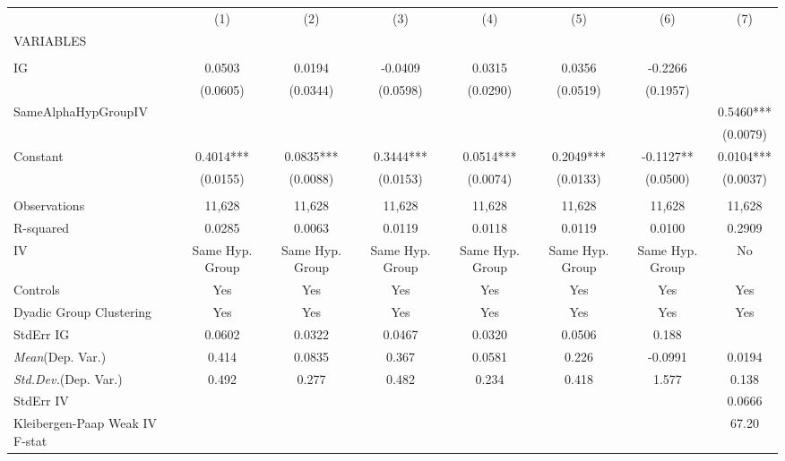 \documentclass[]{article}
\begin{document}
\begin{tabular}{lccccccc} \hline
 & (1) & (2) & (3) & (4) & (5) & (6) & (7) \\
VARIABLES &  &  &  &  &  &  &  \\ \hline
 &  &  &  &  &  &  &  \\
IG & 0.0503 & 0.0194 & -0.0409 & 0.0315 & 0.0356 & -0.2266 &  \\
 & (0.0605) & (0.0344) & (0.0598) & (0.0290) & (0.0519) & (0.1957) &  \\
SameAlphaHypGroupIV &  &  &  &  &  &  & 0.5460*** \\
 &  &  &  &  &  &  & (0.0079) \\
Constant & 0.4014*** & 0.0835*** & 0.3444*** & 0.0514*** & 0.2049*** & -0.1127** & 0.0104*** \\
 & (0.0155) & (0.0088) & (0.0153) & (0.0074) & (0.0133) & (0.0500) & (0.0037) \\
 &  &  &  &  &  &  &  \\
Observations & 11,628 & 11,628 & 11,628 & 11,628 & 11,628 & 11,628 & 11,628 \\
R-squared & 0.0285 & 0.0063 & 0.0119 & 0.0118 & 0.0119 & 0.0100 & 0.2909 \\
IV & Same Hyp. Group & Same Hyp. Group & Same Hyp. Group & Same Hyp. Group & Same Hyp. Group & Same Hyp. Group & No \\
Controls & Yes & Yes & Yes & Yes & Yes & Yes & Yes \\
Dyadic Group Clustering & Yes & Yes & Yes & Yes & Yes & Yes & Yes \\
StdErr IG & 0.0602 & 0.0322 & 0.0467 & 0.0320 & 0.0506 & 0.188 &  \\
\textit{Mean}(Dep. Var.) & 0.414 & 0.0835 & 0.367 & 0.0581 & 0.226 & -0.0991 & 0.0194 \\
\textit{Std.Dev.}(Dep. Var.) & 0.492 & 0.277 & 0.482 & 0.234 & 0.418 & 1.577 & 0.138 \\
StdErr IV &  &  &  &  &  &  & 0.0666 \\
 Kleibergen-Paap Weak IV F-stat &  &  &  &  &  &  & 67.20 \\ \hline
\end{tabular}
\end{document}

